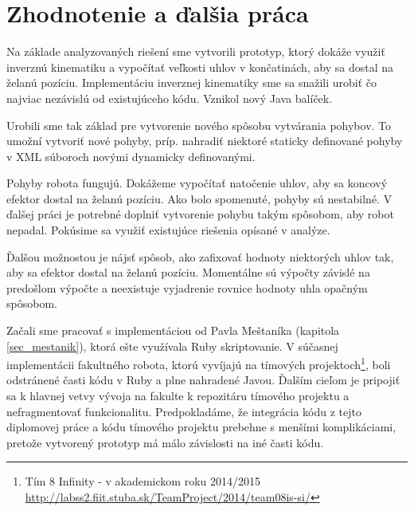 \section{Zhodnotenie a ďalšia práca}

Na základe analyzovaných riešení sme vytvorili prototyp, ktorý dokáže využiť inverznú kinematiku a vypočítať veľkosti uhlov v končatinách, aby sa dostal na želanú pozíciu. Implementáciu inverznej kinematiky sme sa snažili urobiť čo najviac nezávislú od existujúceho kódu. Vznikol nový Java balíček.

Urobili sme tak základ pre vytvorenie nového spôsobu vytvárania pohybov. To umožní vytvoriť nové pohyby, príp. nahradiť niektoré staticky definované pohyby v XML súboroch novými dynamicky definovanými.

Pohyby robota fungujú. Dokážeme vypočítať natočenie uhlov, aby sa koncový efektor dostal na želanú pozíciu. Ako bolo spomenuté, pohyby sú nestabilné. V ďalšej práci je potrebné doplniť vytvorenie pohybu takým spôsobom, aby robot nepadal. Pokúsime sa využiť existujúce riešenia opísané v analýze.

Ďalšou možnostou je nájsť spôsob, ako zafixovať hodnoty niektorých uhlov tak, aby sa efektor dostal na želanú pozíciu. Momentálne sú výpočty závislé na predošlom výpočte a neexistuje vyjadrenie rovnice hodnoty uhla opačným spôsobom.

Začali sme pracovať s implementáciou od Pavla Meštaníka (kapitola \ref{sec_mestanik}), ktorá ešte využívala Ruby skriptovanie. V súčasnej implementácii fakultného robota, ktorú vyvíjajú na tímových projektoch\footnote{Tím 8 Infinity - v akademickom roku 2014/2015 \url{http://labss2.fiit.stuba.sk/TeamProject/2014/team08is-si/} }, boli odstránené časti kódu v Ruby a plne nahradené Javou. Ďalším cieľom je pripojiť sa k hlavnej vetvy vývoja na fakulte k repozitáru tímového projektu a nefragmentovať funkcionalitu. Predpokladáme, že integrácia kódu z tejto diplomovej práce a kódu tímového projektu prebehne s menšími komplikáciami, pretože vytvorený prototyp má málo závislosti na iné časti kódu.

